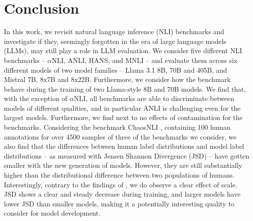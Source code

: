 \section{Conclusion}

In this work, we revisit natural language inference (NLI) benchmarks and investigate if they, seemingly forgotten in the era of large language models (LLMs), may still play a role in LLM evaluation.
We consider five different NLI benchmarks -- $\alpha$NLI, ANLI, HANS, and MNLI -- and evaluate them across six different models of two model families -- Llama 3.1 8B, 70B and 405B, and Mistral 7B, 8x7B and 8x22B.
Furthermore, we consider how the benchmark behave during the training of two Llama-style 8B and 70B models.
We find that, with the exception of $\alpha$NLI, all benchmarks are able to discriminate between models of different qualities, and in particular ANLI is challenging even for the largest models.
Furthermore, we find next to no effects of contamination for the benchmarks.
Considering the benchmark ChaosNLI \citep{nie-etal-2020-learn}, containing 100 human annotations for over 4500 samples of three of the benchmarks we consider, we also find that the differences between human label distributions and model label distributions -- as measured with Jensen Shannon Divergence (JSD) -- 
have gotten smaller with the new generation of models.
However, they are still substantially higher than the distributional difference between two populations of humans. 
Interestingly, contrary to the findings of \citet{nie-etal-2020-learn}, we do observe a clear effect of scale.
JSD shows a clear and steady decrease during training, and larger models have lower JSD than smaller models, making it a potentially interesting quality to consider for model development.
